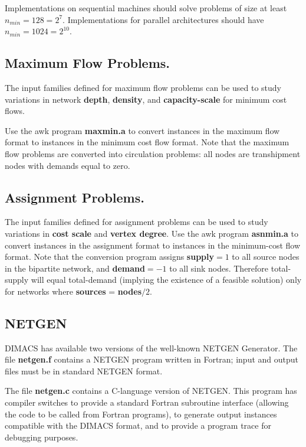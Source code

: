 Implementations on sequential machines should solve problems of size
at least $n_{min} = 128 = 2^{7}$.  Implementations for parallel
architectures should have $n_{min}= 1024 = 2^{10}$.

\subsection{Maximum Flow Problems.}

The input families defined for maximum flow problems can be used to
study variations in network {\bf depth}, {\bf density}, and {\bf
capacity-scale} for minimum cost flows.

Use the awk program {\bf maxmin.a} to convert instances in the maximum
flow format to instances in the minimum cost flow format.  Note that
the maximum flow problems are converted into circulation problems: all
nodes are transhipment nodes with demands equal to zero.

\subsection{Assignment Problems.} 

The input families defined for assignment problems can be used to
study variations in {\bf cost scale} and {\bf vertex degree}.  Use the
awk  program {\bf asnmin.a} to convert instances in the
assignment format to instances in the minimum-cost flow format.  Note
that the conversion program assigns {\bf supply}$=1$ to all source
nodes in the bipartite network, and {\bf demand}$=-1$ to all sink
nodes.  Therefore total-supply will equal total-demand (implying the
existence of a feasible solution) only for networks where {\bf
sources} = {\bf nodes}$/2$.

\subsection{NETGEN}
DIMACS has available two versions of the well-known NETGEN Generator.
The file {\bf netgen.f} contains a NETGEN program written in Fortran;
input and output files must be in standard NETGEN format.

The file {\bf netgen.c} contains a C-language version of NETGEN.  This
program has compiler switches to provide a standard Fortran subroutine
interface (allowing the code to be called from Fortran programs),
to generate output instances compatible with the DIMACS format, and
to provide a program trace for debugging purposes.

